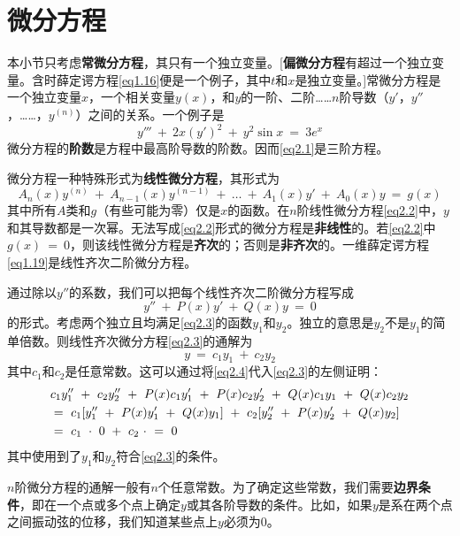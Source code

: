 \documentclass[12pt,a4paper,openany]{ctexbook}
\begin{document}
\section{微分方程}
\begin{flushleft}
    \setlength{\parindent}{2em}
本小节只考虑\textbf{常微分方程}，其只有一个独立变量。[\textbf{偏微分方程}有超过一个独立变量。含时薛定谔方程\eqref{eq1.16}便是一个例子，其中$t$和$x$是独立变量。]常微分方程是一个独立变量$x$，一个相关变量$y(x)$，和$y$的一阶、二阶……$n$阶导数（$y'$，$y''$，……，$y^{(n)}$）之间的关系。一个例子是
\begin{equation}
    y'''\ +\ 2x(y')^2\ +\ y^2\sin x\ =\ 3e^x
    \label{eq2.1}
\end{equation}
微分方程的\textbf{阶数}是方程中最高阶导数的阶数。因而\eqref{eq2.1}是三阶方程。

微分方程一种特殊形式为\textbf{线性微分方程}，其形式为
\begin{equation}
    A_n(x)y^{(n)}\ +\ A_{n-1}(x)y^{(n-1)}\ +\ \dots\ +\ A_1(x)y'\ +\ A_0(x)y\ =\ g(x)
    \label{eq2.2}
\end{equation}
其中所有$A$类和$g$（有些可能为零）仅是$x$的函数。在$n$阶线性微分方程\eqref{eq2.2}中，$y$和其导数都是一次幂。无法写成\eqref{eq2.2}形式的微分方程是\textbf{非线性}的。若\eqref{eq2.2}中$g(x)\ =\ 0$，则该线性微分方程是\textbf{齐次}的；否则是\textbf{非齐次}的。一维薛定谔方程\eqref{eq1.19}是线性齐次二阶微分方程。

通过除以$y''$的系数，我们可以把每个线性齐次二阶微分方程写成
\begin{equation}
    y''\ +\ P(x)y'\ +\ Q(x)y\ =\ 0
    \label{eq2.3}
\end{equation}
的形式。考虑两个独立且均满足\eqref{eq2.3}的函数$y_1$和$y_2$。独立的意思是$y_2$不是$y_1$的简单倍数。则线性齐次微分方程\eqref{eq2.3}的通解为
\begin{equation}
    y\ =\ c_1y_1\ +\ c_2y_2
    \label{eq2.4}
\end{equation}
其中$c_1$和$c_2$是任意常数。这可以通过将\eqref{eq2.4}代入\eqref{eq2.3}的左侧证明：
\begin{align}
    &c_1y_1''\ +\ c_2y_2''\ +\ P(x)c_1y_1'\ +\ P(x)c_2y_2'\ +\ Q(x)c_1y_1\ +\ Q(x)c_2y_2 \notag \\
    &=\ c_1[y_1''\ +\ P(x)y_1'\ +\ Q(x)y_1]\ +\  c_2[y_2''\ +\ P(x)y_2'\ +\ Q(x)y_2] \notag \\
    &=\ c_1\ \cdot\ 0\ +\ c_2\ \cdot\ =\ 0
\end{align}
其中使用到了$y_1$和$y_2$符合\eqref{eq2.3}的条件。

$n$阶微分方程的通解一般有$n$个任意常数。为了确定这些常数，我们需要\textbf{边界条件}，即在一个点或多个点上确定$y$或其各阶导数的条件。比如，如果$y$是系在两个点之间振动弦的位移，我们知道某些点上$y$必须为0。


\end{flushleft}
\end{document}
